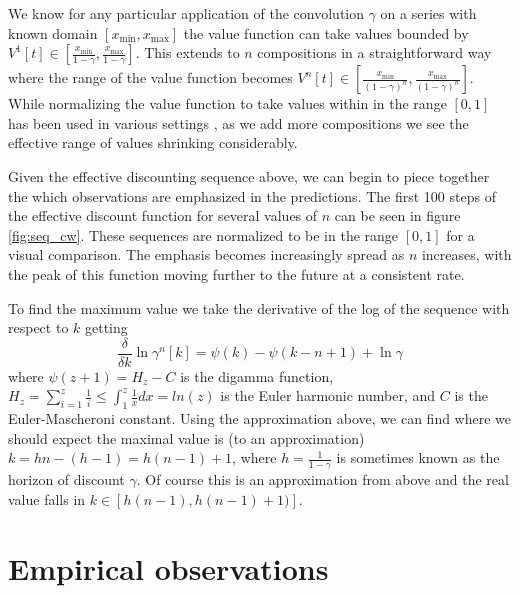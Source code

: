 \documentclass[11pt]{article} %
\begin{document}
We know for
any particular application of the convolution $\gamma$ on a series
with known domain $[x_{\text{min}} , x_{\text{max}}]$ the value function can take values
bounded by $V^1[t] \in [\frac{x_{\text{min}}}{1-\gamma},
\frac{x_{\text{max}}}{1-\gamma}]$. This extends to $n$ compositions in a
straightforward way where the range of the value function becomes
$V^n[t] \in [\frac{x_{\text{min}}}{(1-\gamma)^n},
\frac{x_{\text{max}}}{(1-\gamma)^n}]$.
%
%
While normalizing the value function to take values within in the
range $[0,1]$ has been used in various settings
\parencite{schlegel2021general}, as we add
more compositions we see the effective range of values shrinking
considerably.

Given the effective discounting sequence above, we can begin to piece together
the which observations are emphasized in the predictions.
The first 100 steps of the effective discount function
for several values of $n$ can be seen in figure
\ref{fig:seq_cw}.
These sequences are normalized to be in the range $[0,1]$ for a visual
comparison. The emphasis becomes increasingly spread as $n$ increases,
with the peak of this function moving further to the future at a
consistent rate.

To find the maximum value we
take the derivative of the log of the sequence with respect to $k$
getting
%
\[\frac{\delta}{\delta k} \ln \gamma^n[k] = \psi(k) - \psi(k-n+1) + \ln\gamma\]
%
where $\psi(z+1) = H_{z} - C$ is the digamma function, $H_{z} =
\sum_{i=1}^z \frac{1}{i} \leq \int_{1}^z \frac{1}{x} dx = ln(z)$ is the Euler
harmonic number, and $C$ is the Euler-Mascheroni
constant. Using the approximation above, we can find where we should
expect the maximal value is (to an approximation) $k = hn - (h-1)=h(n-1)+1$,
where $h=\frac{1}{1-\gamma}$ is sometimes known as the horizon of
discount $\gamma$. Of course this is an approximation from above and
the real value falls in $k \in [h(n-1), h(n-1) + 1)]$.


\section{Empirical observations}
\end{document}
